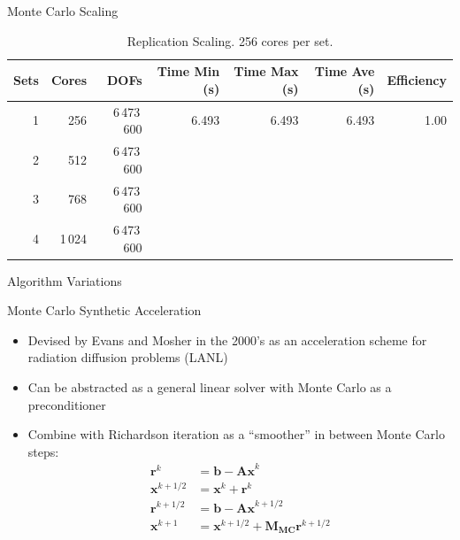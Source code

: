 \documentclass{beamer}
\begin{document}
\begin{frame}{Monte Carlo Scaling}
  \vspace{-0.2in}

  \begin{table}[htb!]
    \tiny
    \begin{center}
      \begin{tabular}{rrrrrrr}
        \toprule
        \multicolumn{1}{r}{Sets} &
        \multicolumn{1}{r}{Cores} &
        \multicolumn{1}{r}{DOFs} &
        \multicolumn{1}{r}{Time Min (s)} &
        \multicolumn{1}{r}{Time Max (s)} &
        \multicolumn{1}{r}{Time Ave (s)} &
        \multicolumn{1}{r}{Efficiency}
        \\ \midrule
        1 & 256 & 6\,473\,600 & 6.493 & 6.493 & 6.493 & 1.00 \\
        2 & 512 & 6\,473\,600 &  &  & & \\
        3 & 768 & 6\,473\,600 &  &  & & \\
        4 & 1\,024 & 6\,473\,600 & &  & & \\
        \bottomrule
      \end{tabular}
    \end{center}
    \vspace{-0.09in}
    \caption{\small Replication Scaling. 256 cores per set.}
  \end{table} 

\end{frame}

\begin{frame}

  \center Algorithm Variations
  
\end{frame}

\begin{frame}{Monte Carlo Synthetic Acceleration}
  \begin{itemize}
  \item Devised by Evans and Mosher in the 2000's as an acceleration
    scheme for radiation diffusion problems (LANL)
    \vfill
  \item Can be abstracted as a general linear solver with Monte Carlo as a
    preconditioner
    \vfill
  \item Combine with Richardson iteration as a ``smoother'' in between
    Monte Carlo steps:
    \begin{align*}
      \mathbf{r}^k &= \mathbf{b} - \mathbf{Ax}^k \\
      \mathbf{x}^{k+1/2} &= \mathbf{x}^k + \mathbf{r}^k \\
      \mathbf{r}^{k+1/2} &= \mathbf{b} - \mathbf{Ax}^{k+1/2} \\
      \mathbf{x}^{k+1} &= \mathbf{x}^{k+1/2} + \mathbf{M_{MC}} \mathbf{r}^{k+1/2}
    \end{align*}
  \end{itemize}
\end{frame}
\end{document}

